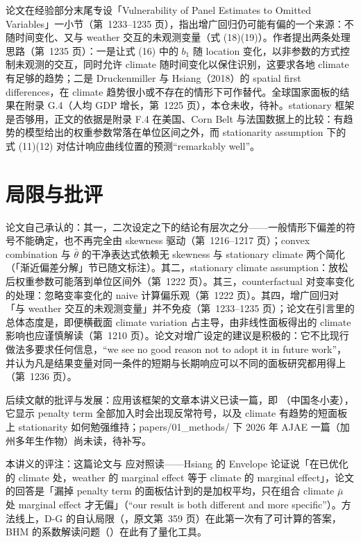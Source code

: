 论文在经验部分末尾专设「Vulnerability of Panel Estimates to Omitted Variables」一小节（第~1233--1235 页），指出增广回归仍可能有偏的一个来源：不随时间变化、又与 weather 交互的未观测变量（式 (18)(19)）。作者提出两条处理思路（第~1235 页）：一是让式 (16) 中的 $b_1$ 随 location 变化，以非参数的方式控制未观测的交互，同时允许 climate 随时间变化以保住识别，这要求各地 climate 有足够的趋势；二是 Druckenmiller 与 Hsiang（2018）的 spatial first differences，在 climate 趋势很小或不存在的情形下可作替代。全球国家面板的结果在附录 G.4（人均 GDP 增长，第~1225 页），本仓未收，待补。stationary 框架是否够用，正文的依据是附录 F.4 在美国、Corn Belt 与法国数据上的比较：有趋势的模型给出的权重参数常落在单位区间之外，而 stationarity assumption 下的式 (11)(12) 对估计响应曲线位置的预测``remarkably well''\citep[第~1222 页]{merel2021climate}。

\section{局限与批评}

论文自己承认的：其一，二次设定之下的结论有层次之分——一般情形下偏差的符号不能确定，也不再完全由 skewness 驱动（第~1216--1217 页）；convex combination 与 $\bar\theta$ 的干净表达式依赖无 skewness 与 stationary climate 两个简化（「渐近偏差分解」节已随文标注）。其二，stationary climate assumption：放松后权重参数可能落到单位区间外（第~1222 页）。其三，counterfactual 对变率变化的处理：忽略变率变化的 naive 计算偏乐观（第~1222 页）。其四，增广回归对「与 weather 交互的未观测变量」并不免疫（第~1233--1235 页）；论文在引言里的总体态度是，即便横截面 climate variation 占主导，由非线性面板得出的 climate 影响也应谨慎解读（第~1210 页）。论文对增广设定的建议是积极的：它不比现行做法多要求任何信息，``we see no good reason not to adopt it in future work''\citep[第~1236 页]{merel2021climate}，并认为凡是结果变量对同一条件的短期与长期响应可以不同的面板研究都用得上（第~1236 页）。

后续文献的批评与发展：应用该框架的文章本讲义已读一篇，即 （中国冬小麦），它显示 penalty term 全部加入时会出现反常符号，以及 climate 有趋势的短面板上 stationarity 如何勉强维持；papers/01\_methods/ 下 2026 年 AJAE 一篇（加州多年生作物）尚未读，待补写。

本讲义的评注：这篇论文与  应对照读——Hsiang 的 Envelope 论证说「在已优化的 climate 处，weather 的 marginal effect 等于 climate 的 marginal effect」，论文的回答是「漏掉 penalty term 的面板估计到的是加权平均，只在组合 climate $\bar{\mu}$ 处 marginal effect 才无偏」（``our result is both different and more specific''\citep[第~1217 页]{merel2021climate}）。方法线上，D-G 的自认局限（，原文第~359 页）在此第一次有了可计算的答案，BHM 的系数解读问题（）在此有了量化工具。


